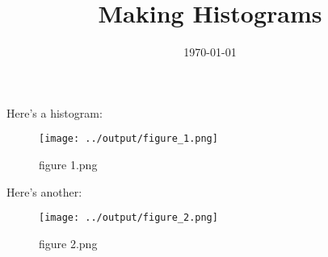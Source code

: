 \documentclass[a4paper,11pt]{article}
\title{Making Histograms}
\date{\today}
\begin{document}
\maketitle

Here's a histogram:

\begin{figure}[!ht]
	\centering
	\texttt{[image: ../output/figure\_1.png]}
	\caption{figure 1.png}
	\label{fig:1}
\end{figure}

Here's another:
\begin{figure}[!ht]
	\centering
	\texttt{[image: ../output/figure\_2.png]}
	\caption{figure 2.png}
	\label{fig:2}
\end{figure}
\end{document}
